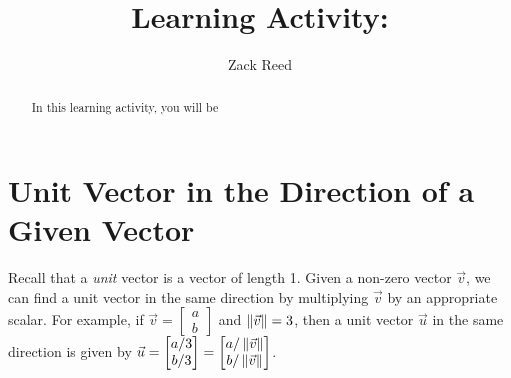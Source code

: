 \documentclass{ximera}
\author{Zack Reed}
\title{Learning Activity: }
\begin{document}
\begin{abstract}

    In this learning activity, you will be 
\end{abstract}
\maketitle

\section*{Unit Vector in the Direction of a Given Vector}
Recall that a {\it unit} vector is a vector of length 1.  Given a non-zero vector $\vec{v}$, we can find a unit vector in the same direction by multiplying $\vec{v}$ by an appropriate scalar.  For example, if $\vec{v}=\begin{bmatrix}a\\b\end{bmatrix}$ and $\left\|\vec{v}\right\|=3$, then a unit vector $\vec{u}$ in the same direction is given by $\vec{u}=\begin{bmatrix}a/3\\b/3\end{bmatrix}=\begin{bmatrix}a/\left\|\vec{v}\right\|\\b/\left\|\vec{v}\right\|\end{bmatrix}$.


 
\begin{center}
\end{center}
\end{document}
